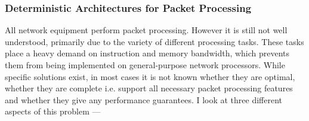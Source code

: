 \documentclass[11pt, a4paper]{article}
\begin{document}
\begin{small}

\subsubsection*{\small Deterministic Architectures for Packet Processing}

All network equipment perform packet processing. However 
it is still not well understood, primarily due to the variety of
different processing tasks.
These tasks place a heavy demand on instruction and memory bandwidth, which 
prevents them from being implemented on general-purpose network processors.
While specific solutions exist, in most cases it is not known whether they
are optimal, whether they are complete i.e. support all necessary packet processing features and whether they
give any performance guarantees. I look at three different aspects of this problem ---

 


\begin{enumerate}



\end{enumerate}
\end{small}
\end{document}
